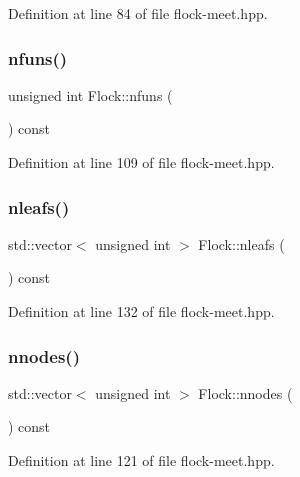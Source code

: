 Definition at line 84 of file flock-\/meet.\+hpp.

\mbox{\label{class_flock_ac20edfc8eced5e6f8918e1530475207a}} 
\subsubsection{\texorpdfstring{nfuns()}{nfuns()}}
{\footnotesize\ttfamily unsigned int Flock\+::nfuns (\begin{DoxyParamCaption}{ }\end{DoxyParamCaption}) const\hspace{0.3cm}{\ttfamily [inline]}}



Definition at line 109 of file flock-\/meet.\+hpp.

\mbox{\label{class_flock_a056862c4084f7c6381bec705d80c0afb}} 
\subsubsection{\texorpdfstring{nleafs()}{nleafs()}}
{\footnotesize\ttfamily std\+::vector$<$ unsigned int $>$ Flock\+::nleafs (\begin{DoxyParamCaption}{ }\end{DoxyParamCaption}) const\hspace{0.3cm}{\ttfamily [inline]}}



Definition at line 132 of file flock-\/meet.\+hpp.

\mbox{\label{class_flock_a6d1da223af2d612e9cc1a4b11073f2ec}} 
\subsubsection{\texorpdfstring{nnodes()}{nnodes()}}
{\footnotesize\ttfamily std\+::vector$<$ unsigned int $>$ Flock\+::nnodes (\begin{DoxyParamCaption}{ }\end{DoxyParamCaption}) const\hspace{0.3cm}{\ttfamily [inline]}}



Definition at line 121 of file flock-\/meet.\+hpp.

